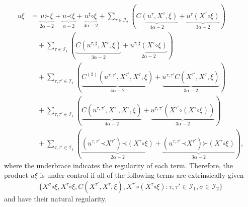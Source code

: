 \documentclass[a4paper, 11pt]{article}
\newcommand{\para}{\mathord{\prec}}
\newcommand{\lpara}{\mathord{\succ}}
\newcommand{\reso}{\mathord{\circ}}
\begin{document}
\begin{align*}
  u \xi & = \underbrace{u \lpara \xi}_{2 \alpha - 2} + \underbrace{u \para
  \xi}_{\alpha - 2} + \underbrace{u^{\sharp} \reso \xi}_{4 \alpha - 2} +
  \sum_{\tau \in \mathcal{I}_2} (\underbrace{C (u^{\tau}, X^{\tau}, \xi)}_{4
  \alpha - 2} + \underbrace{u^{\tau} (X^{\tau} \reso \xi)}_{3 \alpha - 2})\\
  &\quad + \sum_{\tau \in \mathcal{I}_1} (\underbrace{C (u^{\tau, \sharp}, X^{\tau},
  \xi)}_{3 \alpha - 2} + \underbrace{u^{\tau, \sharp} (X^{\tau} \reso \xi)}_{2
  \alpha - 2})\\
  &\quad + \sum_{\tau, \tau' \in \mathcal{I}_1} (\underbrace{C^{(2)} (u^{\tau,
  \tau'}, X^{\tau'}, X^{\tau}, \xi)}_{4 \alpha - 2} + \underbrace{u^{\tau,
  \tau'} C (X^{\tau'}, X^{\tau}, \xi)}_{3 \alpha - 2})\\
  &\quad + \sum_{\tau, \tau' \in \mathcal{I}_1} (\underbrace{C (u^{\tau, \tau'},
  X^{\tau'}, X^{\tau}, \xi)}_{4 \alpha - 2} + \underbrace{u^{\tau, \tau'}
  (X^{\tau'} \reso (X^{\tau} \reso \xi))}_{3 \alpha - 2})\\
  &\quad + \sum_{\tau, \tau' \in \mathcal{I}_1} (\underbrace{(u^{\tau, \tau'} \para
  X^{\tau'}) \para (X^{\tau} \reso \xi)}_{2 \alpha - 2} +
  \underbrace{(u^{\tau, \tau'} \para X^{\tau'}) \lpara (X^{\tau} \reso \xi)}_{3
  \alpha - 2}),
\end{align*}
where the underbrace indicates the regularity of each term. Therefore, the product $u \xi$ is under control if all of the following terms are extrinsically given
\begin{equation}\label{eq:extended-distribution} \{ X^{\sigma} \reso \xi, X^{\tau} \reso
  \xi, C (X^{\tau'}, X^{\tau}, \xi), X^{\tau'} \reso (X^{\tau} \reso \xi) :
  \tau, \tau' \in \mathcal{I}_1, \sigma \in \mathcal{I}_2 \}
\end{equation}
and have their natural regularity.
\end{document}

